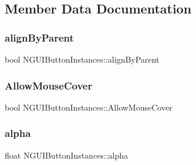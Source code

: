 \subsection{Member Data Documentation}
\hypertarget{class_n_g_u_i_button_instances_a229e842dfd2b0daa612d5e15ad878095}{}\label{class_n_g_u_i_button_instances_a229e842dfd2b0daa612d5e15ad878095} 
\subsubsection{\texorpdfstring{align\+By\+Parent}{alignByParent}}
{\footnotesize\ttfamily bool N\+G\+U\+I\+Button\+Instances\+::align\+By\+Parent}

\hypertarget{class_n_g_u_i_button_instances_aca7ee7182098c0f14365715e670292e4}{}\label{class_n_g_u_i_button_instances_aca7ee7182098c0f14365715e670292e4} 
\subsubsection{\texorpdfstring{Allow\+Mouse\+Cover}{AllowMouseCover}}
{\footnotesize\ttfamily bool N\+G\+U\+I\+Button\+Instances\+::\+Allow\+Mouse\+Cover}

\hypertarget{class_n_g_u_i_button_instances_aa6605898a2b27a896e1eed3e4ae07748}{}\label{class_n_g_u_i_button_instances_aa6605898a2b27a896e1eed3e4ae07748} 
\subsubsection{\texorpdfstring{alpha}{alpha}}
{\footnotesize\ttfamily float N\+G\+U\+I\+Button\+Instances\+::alpha}

\hypertarget{class_n_g_u_i_button_instances_a9ec200c657da0cfa4bbba490bb40d6ad}{}\label{class_n_g_u_i_button_instances_a9ec200c657da0cfa4bbba490bb40d6ad} 
